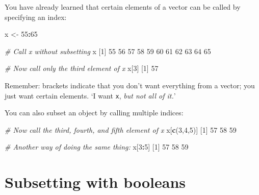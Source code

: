\documentclass[]{book}
\newenvironment{Shaded}{\begin{snugshade}}{\end{snugshade}}
\newcommand{\CommentTok}[1]{\textcolor[rgb]{0.56,0.35,0.01}{\textit{#1}}}
\newcommand{\DecValTok}[1]{\textcolor[rgb]{0.00,0.00,0.81}{#1}}
\newcommand{\KeywordTok}[1]{\textcolor[rgb]{0.13,0.29,0.53}{\textbf{#1}}}
\newcommand{\NormalTok}[1]{#1}
\newcommand{\OperatorTok}[1]{\textcolor[rgb]{0.81,0.36,0.00}{\textbf{#1}}}
\newcommand{\StringTok}[1]{\textcolor[rgb]{0.31,0.60,0.02}{#1}}
\begin{document}
You have already learned that certain elements of a vector can be called by specifying an index:

\begin{Shaded}
\begin{Highlighting}[]
\NormalTok{x <-}\StringTok{ }\DecValTok{55}\OperatorTok{:}\DecValTok{65}

\CommentTok{# Call x without subsetting}
\NormalTok{x}
\NormalTok{ [}\DecValTok{1}\NormalTok{] }\DecValTok{55} \DecValTok{56} \DecValTok{57} \DecValTok{58} \DecValTok{59} \DecValTok{60} \DecValTok{61} \DecValTok{62} \DecValTok{63} \DecValTok{64} \DecValTok{65}
\end{Highlighting}
\end{Shaded}

\begin{Shaded}
\begin{Highlighting}[]
\CommentTok{# Now call only the third element of x}
\NormalTok{x[}\DecValTok{3}\NormalTok{]}
\NormalTok{[}\DecValTok{1}\NormalTok{] }\DecValTok{57}
\end{Highlighting}
\end{Shaded}

Remember: brackets indicate that you don't want everything from a vector; you just want certain elements. `I want \texttt{x}, \emph{but not all of it.}'

You can also subset an object by calling multiple indices:

\begin{Shaded}
\begin{Highlighting}[]
\CommentTok{# Now call the third, fourth, and fifth element of x}
\NormalTok{x[}\KeywordTok{c}\NormalTok{(}\DecValTok{3}\NormalTok{,}\DecValTok{4}\NormalTok{,}\DecValTok{5}\NormalTok{)]}
\NormalTok{[}\DecValTok{1}\NormalTok{] }\DecValTok{57} \DecValTok{58} \DecValTok{59}
\end{Highlighting}
\end{Shaded}

\begin{Shaded}
\begin{Highlighting}[]
\CommentTok{# Another way of doing the same thing:}
\NormalTok{x[}\DecValTok{3}\OperatorTok{:}\DecValTok{5}\NormalTok{]}
\NormalTok{[}\DecValTok{1}\NormalTok{] }\DecValTok{57} \DecValTok{58} \DecValTok{59}
\end{Highlighting}
\end{Shaded}

\hypertarget{subsetting-with-booleans}{%
\section*{Subsetting with booleans}\label{subsetting-with-booleans}}
\end{document}
